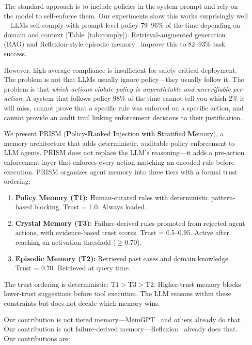 \documentclass[11pt]{article}
\begin{document}
The standard approach is to include policies in the system prompt
and rely on the model to self-enforce them.
Our experiments show this works surprisingly well---LLMs self-comply with prompt-level policy
79--96\% of the time depending on domain and context (Table~\ref{tab:comply}).
Retrieval-augmented generation (RAG) and Reflexion-style episodic
memory~\cite{shinn2023reflexion} improve this to 82--93\% task success.

However, high average compliance is insufficient for safety-critical deployment.
The problem is not that LLMs usually ignore policy---they usually follow it.
The problem is that \emph{which actions violate policy is unpredictable and unverifiable per-action}.
A system that follows policy 98\% of the time cannot tell you
which 2\% it will miss, cannot prove that a specific rule was enforced on a specific action,
and cannot provide an audit trail linking enforcement decisions to their justification.

We present PRISM (\textbf{P}olicy-\textbf{R}anked \textbf{I}njection with \textbf{S}tratified \textbf{M}emory),
a memory architecture that adds deterministic, auditable policy enforcement to LLM agents.
PRISM does not replace the LLM's reasoning---it adds a pre-action enforcement layer
that enforces every action matching an encoded rule before execution.
PRISM organizes agent memory into three tiers with a formal trust ordering:

\begin{enumerate}
\item \textbf{Policy Memory (T1):} Human-curated rules with deterministic pattern-based blocking.
      Trust = 1.0. Always loaded.
\item \textbf{Crystal Memory (T3):} Failure-derived rules promoted from rejected agent actions,
      with evidence-based trust scores. Trust = 0.5--0.95. Active after reaching
      an activation threshold ($\geq 0.70$).
\item \textbf{Episodic Memory (T2):} Retrieved past cases and domain knowledge.
      Trust = 0.70. Retrieved at query time.
\end{enumerate}

The trust ordering is deterministic: $\text{T1} > \text{T3} > \text{T2}$.
Higher-trust memory blocks lower-trust suggestions before tool execution.
The LLM reasons within these constraints but does not decide which memory wins.

Our contribution is not tiered memory---MemGPT~\cite{packer2023memgpt} and others already do that.
Our contribution is not failure-derived memory---Reflexion~\cite{shinn2023reflexion} already does that.
Our contributions are:
\end{document}
